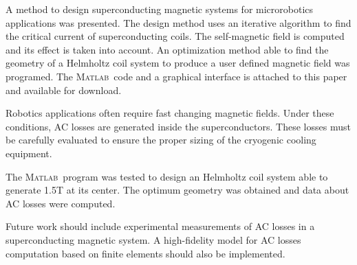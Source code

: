 \documentclass{ws-jmrr}
\newcommand{\MATLAB}{{\textsc{Matlab}}}
\begin{document}
\begin{multicols}{2}
A method to design superconducting magnetic systems for microrobotics applications was presented. The design method uses an iterative algorithm to find the critical current of superconducting coils. The self-magnetic field is computed and its effect is taken into account. An optimization method able to find the geometry of a Helmholtz coil system to produce a user defined magnetic field was programed. The \MATLAB ~code and a graphical interface is attached to this paper and available for download.\par
Robotics applications often require fast changing magnetic fields. Under these conditions, AC losses are generated inside the superconductors. These losses must be carefully evaluated to ensure the proper sizing of the cryogenic cooling equipment.\par
The \MATLAB ~program was tested to design an Helmholtz coil system able to generate 1.5T at its center. The optimum geometry was obtained and data about AC losses were computed.\par
Future work should include experimental measurements of AC losses in a superconducting magnetic system. A high-fidelity model for AC losses computation based on finite elements should also be implemented.





\end{multicols} 
\end{document}
